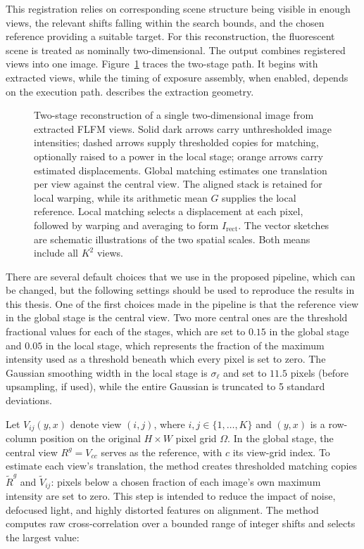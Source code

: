This registration relies on corresponding scene structure being visible in enough views, the relevant shifts falling within the search bounds, and the chosen reference providing a suitable target. For this reconstruction, the fluorescent scene is treated as nominally two-dimensional. The output combines registered views into one image. Figure~\ref{fig:reconstruction-sequence} traces the two-stage path. It begins with extracted views, while the timing of exposure assembly, when enabled, depends on the execution path.  describes the extraction geometry.

\begin{figure}[tbp]
    \centering
    \resizebox{\textwidth}{!}{}
    \caption[Two-stage reconstruction: global alignment and local refinement.]{Two-stage reconstruction of a single two-dimensional image from extracted FLFM views. Solid dark arrows carry unthresholded image intensities; dashed arrows supply thresholded copies for matching, optionally raised to a power in the local stage; orange arrows carry estimated displacements. Global matching estimates one translation per view against the central view. The aligned stack is retained for local warping, while its arithmetic mean $G$ supplies the local reference. Local matching selects a displacement at each pixel, followed by warping and averaging to form $I_{\mathrm{rect}}$. The vector sketches are schematic illustrations of the two spatial scales. Both means include all $K^2$ views.}
    \label{fig:reconstruction-sequence}
\end{figure}

There are several default choices that we use in the proposed pipeline, which can be changed, but the following settings should be used to reproduce the results in this thesis. One of the first choices made in the pipeline is that the reference view in the global stage is the central view. Two more central ones are the threshold fractional values for each of the stages, which are set to $0.15$ in the global stage and $0.05$ in the local stage, which represents the fraction of the maximum intensity used as a threshold beneath which every pixel is set to zero. The Gaussian smoothing width in the local stage is $\sigma_\ell$ and set to $11.5$ pixels (before upsampling, if used), while the entire Gaussian is truncated to 5 standard deviations.

Let $V_{ij}(y,x)$ denote view $(i,j)$, where $i,j\in\{1,\ldots,K\}$ and $(y,x)$ is a row-column position on the original $H\times W$ pixel grid $\Omega$. In the global stage, the central view $R^g=V_{cc}$ serves as the reference, with $c$ its view-grid index.
To estimate each view's translation, the method creates thresholded matching copies $\widetilde R^g$ and $\widetilde V_{ij}$: pixels below a chosen fraction of each image's own maximum intensity are set to zero.
This step is intended to reduce the impact of noise, defocused light, and highly distorted features on alignment.
The method computes raw cross-correlation over a bounded range of integer shifts and selects the largest value:

